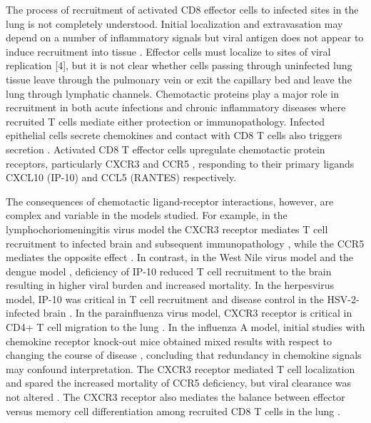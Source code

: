 \documentclass[10pt]{article}
\begin{document}
The process of recruitment of activated CD8 effector cells to infected sites in the lung is not completely understood.  Initial localization and extravasation may depend on a number of inflammatory signals but viral antigen does not appear to induce recruitment into tissue \cite{Topham2001}.   Effector cells must localize to sites of viral replication [4], but it is not clear whether cells passing through uninfected lung tissue leave through the pulmonary vein or exit the capillary bed and leave the lung through lymphatic channels. Chemotactic proteins play a major role in recruitment in both acute infections and chronic inflammatory diseases \cite{Bromley2008, Medoff2005} where recruited T cells mediate either protection or immunopathology.  Infected epithelial cells secrete chemokines \cite{Chan2005} and contact with CD8 T cells also triggers secretion \cite{Zhao2000}. Activated CD8 T effector cells upregulate chemotactic protein receptors, particularly CXCR3 and CCR5 \cite{Hoji2005, Groom2011a}, responding to their primary ligands CXCL10 (IP-10) and CCL5 (RANTES) respectively.  

The consequences of chemotactic ligand-receptor interactions, however, are complex \cite{Groom2011a, Groom2011} and variable in the models studied.   For example, in the lymphochoriomeningitis virus model the CXCR3 receptor mediates T cell recruitment to infected brain and subsequent immunopathology \cite{Christensen2004, Christensen2006}, while the CCR5 mediates the opposite effect \cite{DeLemos2005}.  In contrast, in the West Nile virus model \cite{Klein2005} and the dengue model \cite{Hsieh2006}, deficiency of IP-10 reduced T cell recruitment to the brain resulting in higher viral burden and increased mortality.   In the herpesvirus model, IP-10 was critical in T cell recruitment and disease control in the HSV-2-infected brain \cite{Wuest2008, Thapa2008}.  In the parainfluenza virus model, CXCR3 receptor is critical in CD4+ T cell migration to the lung \cite{Kohlmeier2009}.  In the influenza A model, initial studies with chemokine receptor knock-out mice obtained mixed results with respect to changing the course of disease \cite{Dawson2000, Wareing2004}, concluding that redundancy in chemokine signals may confound interpretation.   The CXCR3 receptor mediated T cell localization and spared the increased mortality of CCR5 deficiency, but viral clearance was not altered \cite{Fadel2008}.  The CXCR3 receptor also mediates the balance between effector versus memory cell differentiation among recruited CD8 T cells in the lung \cite{Kohlmeier2011}.   
\end{document}
